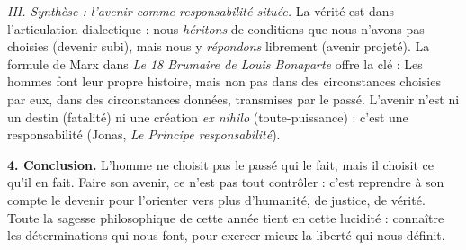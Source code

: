 \documentclass[11pt]{article}
\newcommand{\cle}[1]{{\popxbold\color{popdark}#1}}
\begin{document}
\begin{exoresolu}
\emph{III. Synthèse : l'avenir comme responsabilité située.}
La vérité est dans l'articulation dialectique : nous \emph{héritons} de conditions que nous n'avons pas choisies (devenir subi), mais nous y \emph{répondons} librement (avenir projeté). La formule de Marx dans \emph{Le 18 Brumaire de Louis Bonaparte} offre la clé : \guillemotleft Les hommes font leur propre histoire, mais non pas dans des circonstances choisies par eux, dans des circonstances données, transmises par le passé. \guillemotright L'avenir n'est ni un destin (fatalité) ni une création \emph{ex nihilo} (toute-puissance) : c'est une \cle{responsabilité} (Jonas, \emph{Le Principe responsabilité}).

\textbf{4. Conclusion.} L'homme ne choisit pas le passé qui le fait, mais il choisit ce qu'il en fait. Faire son avenir, ce n'est pas tout contrôler : c'est reprendre à son compte le devenir pour l'orienter vers plus d'humanité, de justice, de vérité. Toute la sagesse philosophique de cette année tient en cette lucidité : connaître les déterminations qui nous font, pour exercer mieux la liberté qui nous définit.
\end{exoresolu}
\end{document}
